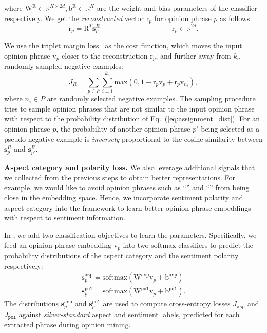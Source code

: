 where $\mathrm{W}^{\mathrm{R}} \in \mathbb{R}^{K\times 2d}, \mathrm{b}^{\mathrm{R}}\in \mathbb{R}^K$ are the weight and bias parameters of the classifier respectively.
%
We get the \textsl{reconstructed} vector $\mathrm{r}_{p}$ for opinion phrase $p$ as follows:
%
\begin{equation}
    \mathrm{r}_{p} = \mathrm{R}^T \mathbf{s}^R_p \qquad\qquad \qquad\qquad \qquad  \mathrm{r}_{p}\in \mathbb{R}^{2d}.
\end{equation}

We use the triplet margin loss~\cite{balntas2016learning}
as the cost function, which moves the input opinion phrase $\mathrm{v}_p$ closer to the reconstruction $\mathrm{r}_{p}$, and further away from $k_n$ randomly sampled negative examples:
\begin{equation}
    J_R = \sum_{p \in P} \sum_{i=1}^{k_n}\text{max}(0, 1- \mathrm{r}_{p} \mathrm{v}_{p}+\mathrm{r}_{p} \mathrm{v}_{n_i}),
\end{equation}
%
where $n_i \in P$ are randomly selected negative examples.
%
The sampling procedure tries to sample opinion phrases that are not similar to the input opinion phrase with respect to the probability distribution of Eq.~(\ref{eq:assignment_dist}).
%
For an opinion phrase $p$, the probability of another opinion phrase $p'$ being selected as a pseudo negative example is \textsl{inversely} proportional to the cosine similarity between $\mathbf{s}^R_p $ and $\mathbf{s}^R_{p'}$.

\smallskip
\noindent \textbf{Aspect category and polarity loss.} We also leverage additional signals that we collected from the previous steps to obtain better representations.
%
For example, we would like to avoid opinion phrases such as ``'' and ``'' from being close in the embedding space. 
%
Hence, we incorporate sentiment polarity and aspect category into the framework to learn better opinion phrase embeddings with respect to sentiment information.

In \canonical{}, we add two classification objectives to learn the parameters. Specifically, we feed an opinion phrase embedding $\mathrm{v}_{p}$ into two softmax classifiers to predict the probability distributions of the aspect category and the sentiment polarity respectively:
%
\begin{align}
    \mathbf{s}_{p}^{\mathtt{asp}}= \text{softmax}(\mathrm{W}^\mathtt{asp}  \mathrm{v}_{p} + \mathrm{b}^\mathtt{asp})\\
    \mathbf{s}_{p}^{\mathtt{pol}}= \text{softmax}(\mathrm{W}^\mathtt{pol}  \mathrm{v}_{p} + \mathrm{b}^\mathtt{pol}).
\end{align}
%
The distributions $\mathbf{s}_{p}^{\mathtt{asp}}$ and $\mathbf{s}_{p}^{\mathtt{pol}}$ are used to compute cross-entropy losses $J_\mathtt{asp}$ and $J_\mathtt{pol}$ against \textsl{silver-standard} aspect and sentiment labels, predicted for each extracted phrase during opinion mining.

